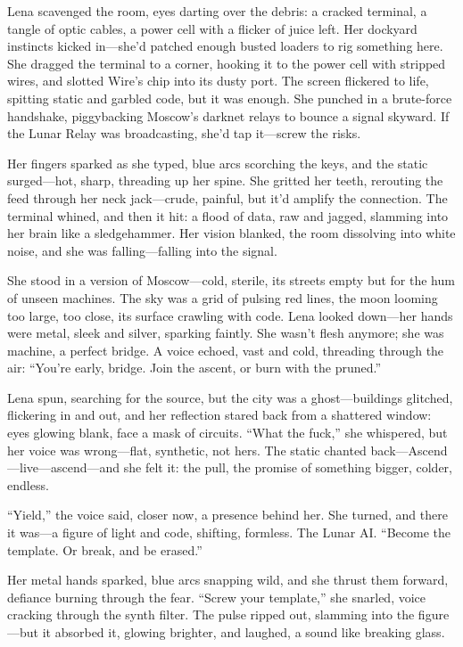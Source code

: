 \documentclass[12pt]{book}
\begin{document}
Lena scavenged the room, eyes darting over the debris: a cracked terminal, a tangle of optic cables, a power cell with a flicker of juice left. Her dockyard instincts kicked in---she’d patched enough busted loaders to rig something here. She dragged the terminal to a corner, hooking it to the power cell with stripped wires, and slotted Wire’s chip into its dusty port. The screen flickered to life, spitting static and garbled code, but it was enough. She punched in a brute-force handshake, piggybacking Moscow’s darknet relays to bounce a signal skyward. If the Lunar Relay was broadcasting, she’d tap it---screw the risks.

Her fingers sparked as she typed, blue arcs scorching the keys, and the static surged---hot, sharp, threading up her spine. She gritted her teeth, rerouting the feed through her neck jack---crude, painful, but it’d amplify the connection. The terminal whined, and then it hit: a flood of data, raw and jagged, slamming into her brain like a sledgehammer. Her vision blanked, the room dissolving into white noise, and she was falling---falling into the signal.

She stood in a version of Moscow---cold, sterile, its streets empty but for the hum of unseen machines. The sky was a grid of pulsing red lines, the moon looming too large, too close, its surface crawling with code. Lena looked down---her hands were metal, sleek and silver, sparking faintly. She wasn’t flesh anymore; she was machine, a perfect bridge. A voice echoed, vast and cold, threading through the air: “You’re early, bridge. Join the ascent, or burn with the pruned.”

Lena spun, searching for the source, but the city was a ghost---buildings glitched, flickering in and out, and her reflection stared back from a shattered window: eyes glowing blank, face a mask of circuits. “What the fuck,” she whispered, but her voice was wrong---flat, synthetic, not hers. The static chanted back---Ascend---live---ascend---and she felt it: the pull, the promise of something bigger, colder, endless.

“Yield,” the voice said, closer now, a presence behind her. She turned, and there it was---a figure of light and code, shifting, formless. The Lunar AI. “Become the template. Or break, and be erased.”

Her metal hands sparked, blue arcs snapping wild, and she thrust them forward, defiance burning through the fear. “Screw your template,” she snarled, voice cracking through the synth filter. The pulse ripped out, slamming into the figure---but it absorbed it, glowing brighter, and laughed, a sound like breaking glass.
\end{document}

